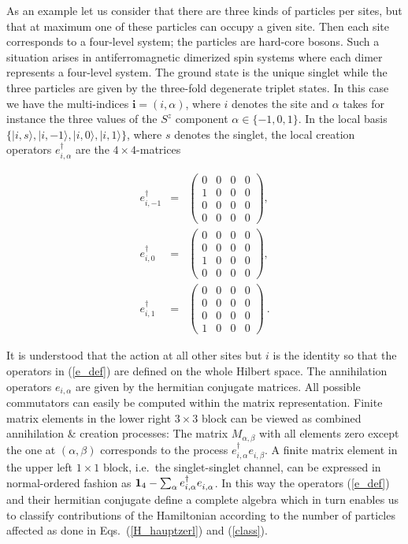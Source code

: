 As an example let us consider that there are three kinds of particles per 
sites, but that at maximum one of these particles can occupy a given site.
Then each site corresponds to a four-level system; the particles are hard-core
bosons. Such a situation arises in antiferromagnetic
dimerized spin systems where each dimer represents a four-level system. 
The ground state is the unique singlet while
the three particles are given by the three-fold degenerate triplet states.
 In this case we have the multi-indices ${\mathbf
  i}=(i,\alpha)$, where $i$ denotes the site and $\alpha$ takes for instance
the three values of the $S^z$ component $\alpha\in\{-1,0,1\}$.  In the local 
basis $\{|i,s\rangle,|i,-1\rangle,|i,0\rangle,|i,1\rangle\}$, where $s$ 
denotes the singlet, the local creation operators $e_{i,\alpha}^{\dagger}$ 
are the $4\times 4$-matrices 
\begin{mathletters}
\label{e_def}
\begin{eqnarray}
  e_{i,-1}^{\dagger} &=&\left(\begin{array}{cccc}
      0&0&0&0\\1&0&0&0\\0&0&0&0\\0&0&0&0
    \end{array}\right),\\
  e_{i,0}^{\dagger} &=& \left(\begin{array}{cccc}
      0&0&0&0\\0&0&0&0\\1&0&0&0\\0&0&0&0
    \end{array}\right),\\
    e_{i,1}^{\dagger} &=& \left(\begin{array}{cccc}
      0&0&0&0\\0&0&0&0\\0&0&0&0\\1&0&0&0
    \end{array}\right)\ .
  \end{eqnarray}
\end{mathletters}
It is understood that the action at all other sites but $i$ is the
identity so that the operators in (\ref{e_def}) are defined on the
whole Hilbert space.
The annihilation operators $e_{i,\alpha}$ are given by the hermitian
conjugate matrices. All possible commutators can easily be computed 
within the matrix representation. Finite matrix elements in the
lower right $3\times3$ block can be viewed as combined annihilation \&
creation processes: The matrix  $M_{\alpha,\beta}$ with all elements
zero except the one at $(\alpha,\beta)$ corresponds to the process
$e_{i,\alpha}^{\dagger} e_{i,\beta}^{\phantom\dagger}$. A finite
matrix element in the upper left $1\times1$ block, i.e.\ the
singlet-singlet channel, can be expressed in normal-ordered fashion as 
${\bf 1}_4 - \sum_\alpha e_{i,\alpha}^{\dagger} 
e_{i,\alpha}^{\phantom\dagger}$. In this way the operators
(\ref{e_def}) and their hermitian
conjugate define a complete algebra which in turn enables us to
classify contributions of the Hamiltonian according to the number
of particles affected as done in Eqs.~(\ref{H_hauptzerl}) and (\ref{class}).

